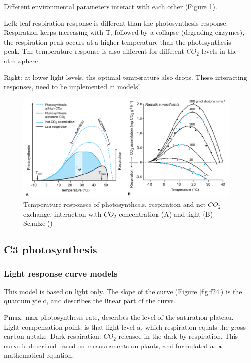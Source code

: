 \documentclass[
  12pt,
  oneside]{book}
\begin{document}
Different environmental parameters interact with each other (Figure \ref{fig:f23}).

Left: leaf respiration response is different than the photosynthesis response. Respiration keeps increasing with T, followed by a collapse (degrading enzymes), the respiration peak occurs at a higher temperature than the photosynthesis peak. The temperature response is also different for different \(CO_2\) levels in the atmosphere.

Right: at lower light levels, the optimal temperature also drops. These interacting responses, need to be implemented in models!

\begin{figure}

{\centering \includegraphics[width=0.8\linewidth]{figures/chap2/Trespons_interactions} 

}

\caption{Temperature responses of photosynthesis, respiration and net $CO_2$ exchange, interaction with $CO_2$ concentration (A) and light  (B)  Schulze ()}\label{fig:f23}
\end{figure}

\hypertarget{c3-photosynthesis}{%
\subsection{C3 photosynthesis}\label{c3-photosynthesis}}

\hypertarget{light-response-curve-models}{%
\subsubsection{Light response curve models}\label{light-response-curve-models}}

This model is based on light only. The slope of the curve (Figure \ref{fig:f24}) is the quantum yield, and describes the linear part of the curve.

Pmax: max photosynthesis rate, describes the level of the saturation plateau. Light compensation point, is that light level at which respiration equals the gross carbon uptake. Dark respiration: \(CO_2\) released in the dark by respiration.
This curve is described based on measurements on plants, and formulated as a mathematical equation.
\end{document}
